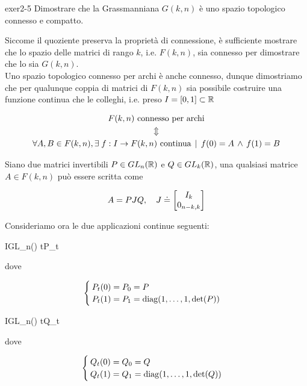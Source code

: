 {exer2-5}
{
Dimostrare che la Grassmanniana $ G(k,n) $ è uno spazio topologico connesso e compatto.
}
{
Siccome il quoziente preserva la proprietà di connessione, è sufficiente mostrare che lo spazio delle matrici di rango $ k $, i.e. $ F(k,n) $, sia connesso per dimostrare che lo sia $ G(k,n) $. \\
Uno spazio topologico connesso per archi è anche connesso, dunque dimostriamo che per qualunque coppia di matrici di $ F(k,n) $ sia possibile costruire una funzione continua che le colleghi, i.e. preso $ I = [0,1] \subset \mathbb{R} $

\begin{gather}
	F(k,n) \text{ connesso per archi} \nonumber \\
	\Updownarrow \\
	\forall A, B \in F(k,n), \E f : I \to F(k,n) \text{ continua} %
	\, \mid \, f(0) = A \, \wedge \, f(1) = B \nonumber
\end{gather}

Siano due matrici invertibili $ P \in GL_{n}(\mathbb{R}) $ e $ Q \in GL_{k}(\mathbb{R}) $, una qualsiasi matrice $ A \in F(k,n) $ può essere scritta come

\begin{equation}
	A = P J Q \qcomma J \doteq \bmqty{I_{k} \\ 0_{n-k,k}}
\end{equation}

Consideriamo ora le due applicazioni continue seguenti:

	{I}{GL_{n}(\R)}
	{t}{P_{t}}

dove

\begin{equation}
	\begin{cases}
		P_{t}(0) = P_{0} = P \\
		P_{t}(1) = P_{1} = \operatorname{diag}(1,\dots,1,\det(P))
	\end{cases}
\end{equation}

	{I}{GL_{n}(\R)}
	{t}{Q_{t}}

dove

\begin{equation}
	\begin{cases}
		Q_{t}(0) = Q_{0} = Q \\
		Q_{t}(1) = Q_{1} = \operatorname{diag}(1,\dots,1,\det(Q))
	\end{cases}
\end{equation}

}
